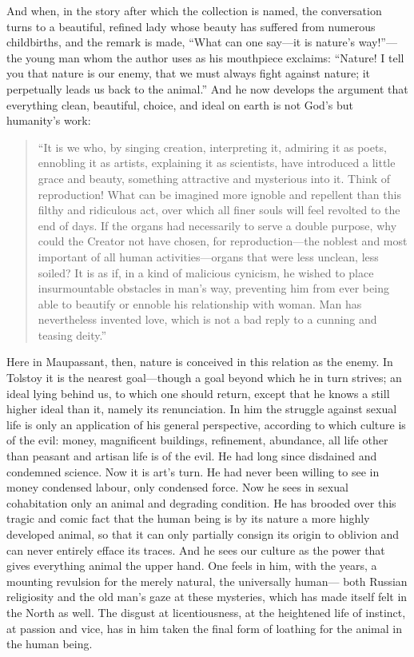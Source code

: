 \documentclass[12pt,a4paper]{article}
\begin{document}
And when, in the story after which the collection is named, the
conversation turns to a beautiful, refined lady whose beauty has
suffered from numerous childbirths, and the remark is made, ``What
can one say---it is nature's way!''---the young man whom the author
uses as his mouthpiece exclaims: ``Nature! I tell you that nature is
our enemy, that we must always fight against nature; it perpetually
leads us back to the animal.'' And he now develops the argument that
everything clean, beautiful, choice, and ideal on earth is not God's
but humanity's work:

\begin{quote}
``It is we who, by singing creation, interpreting it, admiring it as
poets, ennobling it as artists, explaining it as scientists, have
introduced a little grace and beauty, something attractive and
mysterious into it. Think of reproduction! What can be imagined more
ignoble and repellent than this filthy and ridiculous act, over which
all finer souls will feel revolted to the end of days. If the organs
had necessarily to serve a double purpose, why could the Creator not
have chosen, for reproduction---the noblest and most important of all
human activities---organs that were less unclean, less soiled? It is
as if, in a kind of malicious cynicism, he wished to place
insurmountable obstacles in man's way, preventing him from ever being
able to beautify or ennoble his relationship with woman. Man has
nevertheless invented love, which is not a bad reply to a cunning and
teasing deity.''
\end{quote}

Here in Maupassant, then, nature is conceived in this relation as the
enemy. In Tolstoy it is the nearest goal---though a goal beyond which
he in turn strives; an ideal lying behind us, to which one should
return, except that he knows a still higher ideal than it, namely its
renunciation. In him the struggle against sexual life is only an
application of his general perspective, according to which culture is
of the evil: money, magnificent buildings, refinement, abundance, all
life other than peasant and artisan life is of the evil. He had long
since disdained and condemned science. Now it is art's turn. He had
never been willing to see in money condensed labour, only condensed
force. Now he sees in sexual cohabitation only an animal and degrading
condition. He has brooded over this tragic and comic fact that the human
being is by its nature a more highly developed animal, so that it can
only partially consign its origin to oblivion and can never entirely
efface its traces. And he sees our culture as the power that gives
everything animal the upper hand. One feels in him, with the years,
a mounting revulsion for the merely natural, the universally human---
both Russian religiosity and the old man's gaze at these mysteries,
which has made itself felt in the North as well. The disgust at
licentiousness, at the heightened life of instinct, at passion and
vice, has in him taken the final form of loathing for the animal in
the human being.
\end{document}
